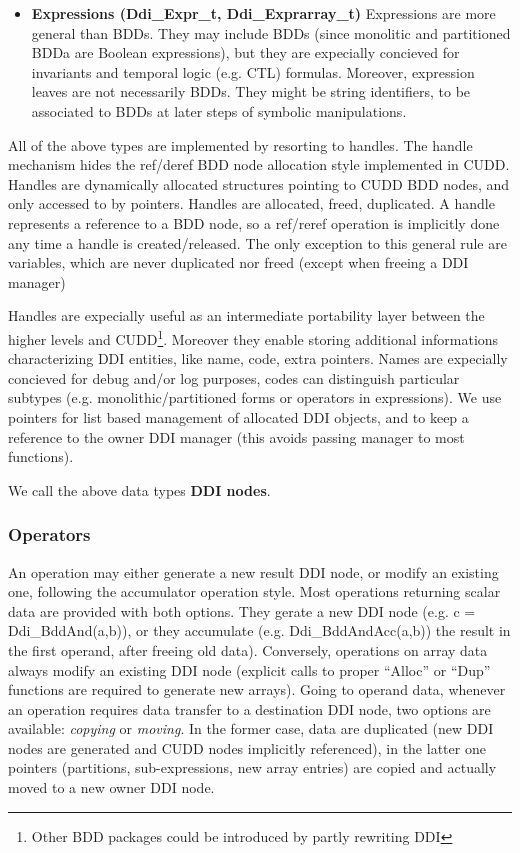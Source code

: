 \begin{itemize}
\item
{\bf Expressions (Ddi\_Expr\_t, Ddi\_Exprarray\_t)}
Expressions are more general than BDDs. They may include BDDs (since
monolitic and partitioned BDDa are Boolean expressions), but they are
expecially concieved for invariants and temporal logic (e.g. CTL)
formulas.
Moreover, expression leaves are not necessarily BDDs. They might be
string identifiers, to be associated to BDDs at later steps of symbolic 
manipulations.
 
\end{itemize}

All of the above types are implemented by resorting to handles. The
handle mechanism hides the ref/deref BDD node allocation style
implemented in CUDD. Handles are dynamically allocated structures 
pointing to CUDD BDD nodes, and only accessed to by pointers.
Handles are allocated, freed, duplicated. A handle represents a
reference to a BDD node, so a ref/reref operation is implicitly done
any time a handle is created/released. The only exception to this
general rule are variables, which are never duplicated nor freed (except
when freeing a DDI manager)

Handles are expecially useful as an intermediate portability layer
between the
higher levels and CUDD\footnote{Other BDD packages could be introduced
by partly rewriting DDI}. Moreover they enable storing additional
informations characterizing DDI entities, like name, code, extra
pointers.
Names are expecially concieved for debug and/or log purposes, codes
can distinguish particular subtypes (e.g. monolithic/partitioned forms
or operators in expressions). We use pointers for list based
management of allocated DDI objects, and to keep a reference to the
owner DDI manager (this avoids passing manager to most functions).

We call the above data types {\bf DDI nodes}.


\subsubsection{Operators}

An operation may either generate a new result DDI node, or modify an
existing one, following the accumulator operation style. 
Most operations returning scalar data are provided with
both options. They gerate a new DDI node (e.g. c = Ddi\_BddAnd(a,b)), 
or they accumulate (e.g. Ddi\_BddAndAcc(a,b))
the result in the first operand, after freeing old data). Conversely,
operations on array data always modify an existing DDI node (explicit
calls to proper ``Alloc'' or ``Dup'' functions are required to generate
new arrays). Going to operand data, whenever an operation requires 
data transfer to a destination DDI node, two options are available:
{\em copying} or {\em moving}. In the former case, data are duplicated
(new DDI nodes are generated and CUDD nodes implicitly referenced), in
the latter one pointers (partitions, sub-expressions, new array
entries) are copied and actually moved to a new owner DDI node.

